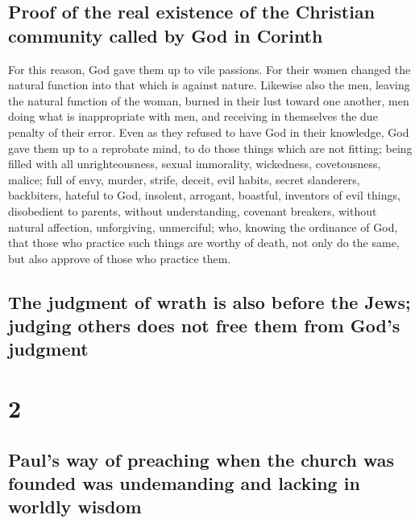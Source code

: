 \hypertarget{proof-of-the-real-existence-of-the-christian-community-called-by-god-in-corinth}{%
\subsection{Proof of the real existence of the Christian community
called by God in
Corinth}\label{proof-of-the-real-existence-of-the-christian-community-called-by-god-in-corinth}}

 For this reason, God gave them up to vile passions. For
their women changed the natural function into that which is against
nature.  Likewise also the men, leaving the natural
function of the woman, burned in their lust toward one another, men
doing what is inappropriate with men, and receiving in themselves the
due penalty of their error.  Even as they refused to have
God in their knowledge, God gave them up to a reprobate mind, to do
those things which are not fitting;  being filled with
all unrighteousness, sexual immorality, wickedness, covetousness,
malice; full of envy, murder, strife, deceit, evil habits, secret
slanderers,  backbiters, hateful to God, insolent,
arrogant, boastful, inventors of evil things, disobedient to parents,
 without understanding, covenant breakers, without
natural affection, unforgiving, unmerciful;  who, knowing
the ordinance of God, that those who practice such things are worthy of
death, not only do the same, but also approve of those who practice
them.

\hypertarget{the-judgment-of-wrath-is-also-before-the-jews-judging-others-does-not-free-them-from-gods-judgment}{%
\subsection{The judgment of wrath is also before the Jews; judging
others does not free them from God's
judgment}\label{the-judgment-of-wrath-is-also-before-the-jews-judging-others-does-not-free-them-from-gods-judgment}}

\hypertarget{section-1}{%
\section{2}\label{section-1}}

\hypertarget{pauls-way-of-preaching-when-the-church-was-founded-was-undemanding-and-lacking-in-worldly-wisdom}{%
\subsection{Paul's way of preaching when the church was founded was
undemanding and lacking in worldly
wisdom}\label{pauls-way-of-preaching-when-the-church-was-founded-was-undemanding-and-lacking-in-worldly-wisdom}}

